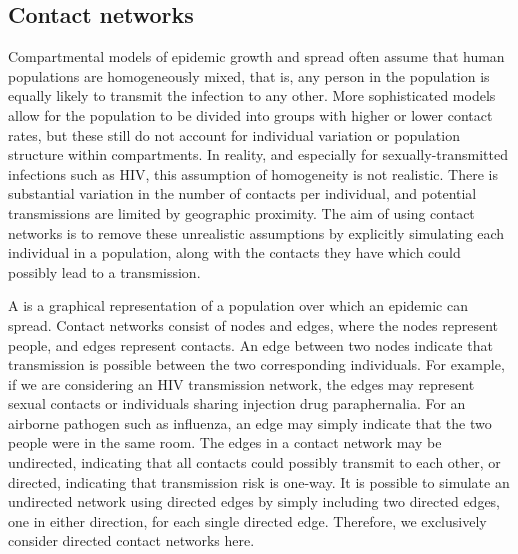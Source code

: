 \subsection{Contact networks}

Compartmental models of epidemic growth and spread often assume that human
populations are homogeneously mixed, that is, any person in the population is
equally likely to transmit the infection to any other. More sophisticated
models allow for the population to be divided into groups with higher or lower
contact rates, but these still do not account for individual variation or
population structure within compartments. In reality, and especially for
sexually-transmitted infections such as HIV, this assumption of homogeneity is
not realistic. There is substantial variation in the number of contacts per
individual, and potential transmissions are limited by geographic proximity.
The aim of using contact networks is to remove these unrealistic assumptions by 
explicitly simulating each individual in a population, along with the contacts
they have which could possibly lead to a transmission.

A  is a graphical representation of a population over
which an epidemic can spread. Contact networks consist of nodes and edges,
where the nodes represent people, and edges represent contacts. An edge between
two nodes indicate that transmission is possible between the two corresponding
individuals. For example, if we are considering an HIV transmission network,
the edges may represent sexual contacts or individuals sharing injection drug
paraphernalia. For an airborne pathogen such as influenza, an edge may simply
indicate that the two people were in the same room. The edges in a contact
network may be undirected, indicating that all contacts could possibly transmit
to each other, or directed, indicating that transmission risk is one-way. It is
possible to simulate an undirected network using directed edges by simply
including two directed edges, one in either direction, for each single directed
edge. Therefore, we exclusively consider directed contact networks here.

